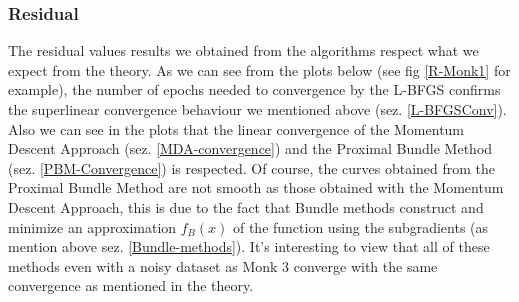 \subsubsection{Residual}
The residual values results we obtained from the algorithms respect what we expect from the theory.  As we can see from the plots below (see fig \ref{R-Monk1} for example), the number of epochs needed to convergence by the L-BFGS confirms the superlinear convergence behaviour we mentioned above (sez. \ref{L-BFGSConv}).  Also we can see in the plots that the linear convergence of the Momentum Descent Approach (sez.  \ref{MDA-convergence}) and the Proximal Bundle Method (sez. \ref{PBM-Convergence}) is respected. Of course, the curves obtained from the Proximal Bundle Method are not smooth as those obtained with the Momentum Descent Approach, this is due to the fact that Bundle methods construct and minimize an approximation $f_B(x)$ of the function using the subgradients (as mention above sez. \ref{Bundle-methods}).  It's interesting to view that all of these methods even with a noisy dataset as Monk 3 converge with the same convergence as mentioned in the theory. 

